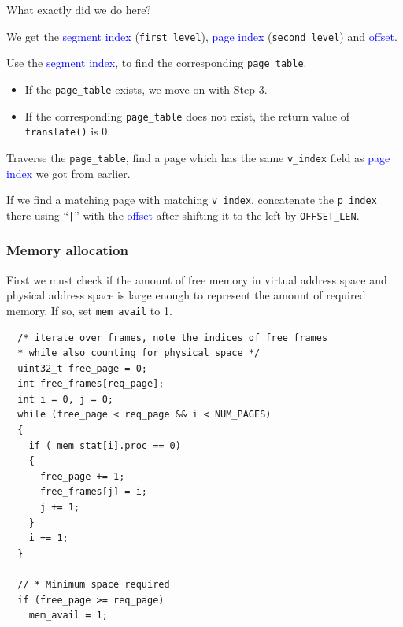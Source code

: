 \documentclass[a4paper]{article}
\numberwithin{equation}{section}
\begin{document}
What exactly did we do here?
\begin{steps}
  \item We get the \textcolor{blue}{segment index} (\texttt{first_level}), \textcolor{blue}{page index} (\texttt{second_level}) and \textcolor{blue}{offset}.
  \item Use the \textcolor{blue}{segment index}, to find the corresponding \texttt{page_table}.
  \begin{itemize}
    \item If the \texttt{page_table} exists, we move on with Step 3.
    \item If the corresponding \texttt{page_table} does not exist, the return value of \texttt{translate()} is 0.
  \end{itemize}

  \item Traverse the \texttt{page_table}, find a page which has the same \texttt{v_index} field as \textcolor{blue}{page index} we got from earlier.
  \item If we find a matching page with matching \texttt{v_index}, concatenate the \texttt{p_index} there using ``\texttt{|}'' with the \textcolor{blue}{offset} after shifting it to the left by \texttt{OFFSET_LEN}.
\end{steps}

\subsubsection{Memory allocation}
First we must check if the amount of free memory in virtual address space and physical address space is large enough to represent the amount of required memory.
If so, set \texttt{mem_avail} to 1.
\begin{mdframed}[leftline=false,rightline=false,backgroundcolor=magenta!10,nobreak=false]
  \begin{verbatim}
  /* iterate over frames, note the indices of free frames
  * while also counting for physical space */
  uint32_t free_page = 0;
  int free_frames[req_page];
  int i = 0, j = 0;
  while (free_page < req_page && i < NUM_PAGES)
  {
    if (_mem_stat[i].proc == 0)
    {
      free_page += 1;
      free_frames[j] = i;
      j += 1;
    }
    i += 1;
  }

  // * Minimum space required
  if (free_page >= req_page)
    mem_avail = 1;
  \end{verbatim}
\end{mdframed}
\end{document}
